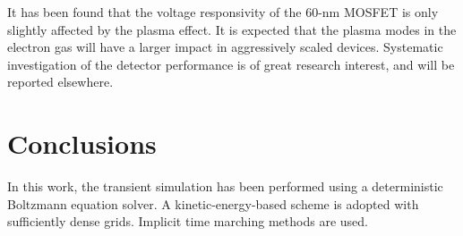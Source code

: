 \documentclass[journal]{IEEEtran}
\begin{document}

   It has been found that the voltage responsivity of the 60-nm MOSFET is only slightly affected by the plasma effect.
   It is expected that the plasma modes in the electron gas will have a larger impact in aggressively scaled devices.
   Systematic investigation of the detector performance is of great research interest, and will be reported elsewhere.  

  


\section{Conclusions}

   In this work, the transient simulation has been performed using a deterministic Boltzmann equation solver. 
   A kinetic-energy-based scheme is adopted with sufficiently dense grids.
   Implicit time marching methods are used.
   
\end{document}
